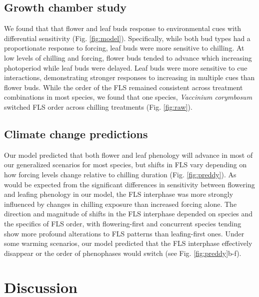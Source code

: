 \documentclass[11pt]{article}
\begin{document}
\subsection*{Growth chamber study}
\noindent We found that that flower and leaf buds response to environmental cues with differential sensitivity (Fig. \ref{fig:model}). Specifically, while both bud types had a proportionate response to forcing, leaf buds were more sensitive to chilling. At low levels of chilling and forcing, flower buds tended to advance which increasing photoperiod while leaf buds were delayed. Leaf buds were more sensitive to cue interactions, demonstrating stronger responses to increasing in multiple cues than flower buds. While the order of the FLS remained consistent across treatment combinations in most species, we found that one species, \textit{Vaccinium corymbosum} switched FLS order across chilling treatments (Fig. \ref{fig:raw}). 

\subsection*{Climate change predictions}
\noindent Our model predicted that both flower and leaf phenology will advance in most of our generalized scenarios for most species, but shifts in FLS vary depending on how forcing levels change relative to chilling duration (Fig. \ref{fig:preddy}). As would be expected from the significant differences in sensitivity between flowering and leafing phenology in our model, the FLS interphase was more strongly influenced by changes in chilling exposure than increased forcing alone. The direction and magnitude of shifts in the FLS interphase depended on species and the specifics of FLS order, with flowering-first and concurrent species tending show more profound alterations to FLS patterns than leafing-first ones. Under some warming scenarios, our model predicted that the FLS interphase effectively disappear or the order of phenophases would switch (see Fig. \ref{fig:preddy}b-f).

\section*{Discussion}
\end{document}
